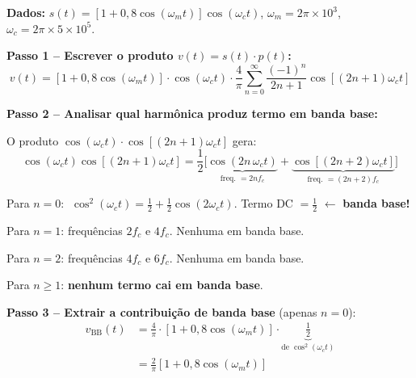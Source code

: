 \documentclass[11pt,a4paper]{article}
\begin{document}
\begin{resolucao}

\textbf{Dados:} $s(t) = [1 + 0{,}8\cos(\omega_m t)]\cos(\omega_c t)$, \; $\omega_m = 2\pi \times 10^3$, \; $\omega_c = 2\pi \times 5 \times 10^5$.

\textbf{Passo 1 -- Escrever o produto $v(t) = s(t) \cdot p(t)$:}
\[
  v(t) = [1 + 0{,}8\cos(\omega_m t)] \cdot \cos(\omega_c t) \cdot \frac{4}{\pi}\sum_{n=0}^{\infty}\frac{(-1)^n}{2n+1}\cos[(2n+1)\omega_c t]
\]

\textbf{Passo 2 -- Analisar qual harmônica produz termo em banda base:}

O produto $\cos(\omega_c t) \cdot \cos[(2n+1)\omega_c t]$ gera:
\[
  \cos(\omega_c t)\cos[(2n+1)\omega_c t] = \frac{1}{2}\big[\underbrace{\cos(2n\,\omega_c t)}_{\text{freq. } = 2nf_c} + \underbrace{\cos[(2n+2)\omega_c t]}_{\text{freq. } = (2n+2)f_c}\big]
\]

Para $n = 0$: $\;\cos^2(\omega_c t) = \frac{1}{2} + \frac{1}{2}\cos(2\omega_c t)$. Termo DC $= \frac{1}{2}$ $\leftarrow$ \textbf{banda base!}

Para $n = 1$: frequências $2f_c$ e $4f_c$. Nenhuma em banda base.

Para $n = 2$: frequências $4f_c$ e $6f_c$. Nenhuma em banda base.

Para $n \geq 1$: \textbf{nenhum termo cai em banda base}.

\textbf{Passo 3 -- Extrair a contribuição de banda base} (apenas $n = 0$):
\begin{align*}
  v_{\text{BB}}(t) &= \frac{4}{\pi} \cdot [1 + 0{,}8\cos(\omega_m t)] \cdot \underbrace{\frac{1}{2}}_{\text{de } \cos^2(\omega_c t)} \\[6pt]
  &= \frac{2}{\pi}[1 + 0{,}8\cos(\omega_m t)]
\end{align*}
\end{resolucao}
\end{document}
